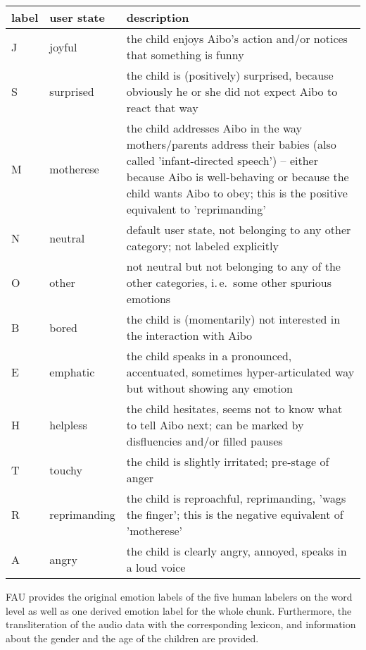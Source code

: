\documentclass[11pt]{article}
\begin{document}
\begin{Form}
  \begin{table}[!h]
    \small
    \centering
    \begin{tabular}{l l p{10cm}}
      \toprule
      label & user state & description \\
      \midrule
      J & joyful        & the child enjoys Aibo's action and/or notices that something is funny\\
      S & surprised     & the child is (positively) surprised, because obviously he or she did not expect Aibo to react that way\\
      M & motherese     & the child addresses Aibo in the way mothers/parents address their babies (also called 'infant-directed speech') -- either because Aibo is well-behaving or because the child wants Aibo to obey; this is the positive equivalent to 'reprimanding'\\
      N & neutral       & default user state, not belonging to any other category; not labeled explicitly\\
      O & other         & not neutral but not belonging to any of the other categories, i.\,e.\ some other spurious emotions\\
      B & bored         & the child is (momentarily) not interested in the interaction with Aibo\\
      E & emphatic      & the child speaks in a pronounced, accentuated, sometimes hyper-articulated way but without showing any emotion\\
      H & helpless      & the child hesitates, seems not to know what to tell Aibo next; can be marked by disfluencies and/or filled pauses\\
      T & touchy        & the child is slightly irritated; pre-stage of anger\\
      R & reprimanding  & the child is reproachful, reprimanding, 'wags the finger'; this is the negative equivalent of 'motherese'\\
      A & angry         & the child is clearly angry, annoyed, speaks in a loud voice\\
      \bottomrule
    \end{tabular}
  \end{table}

  FAU provides the original emotion labels of the five human labelers on the word level as well as one derived emotion label for the whole chunk.
  Furthermore, the transliteration of the audio data with the corresponding lexicon, and information about the gender and the age of the children are provided.



\end{Form}
\end{document}

